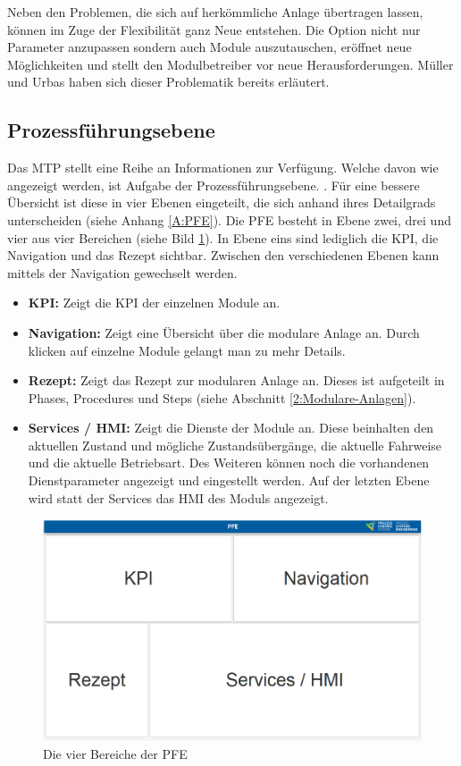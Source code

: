 Neben den Problemen, die sich auf herkömmliche Anlage übertragen lassen, können im Zuge der Flexibilität ganz Neue entstehen. Die Option nicht nur Parameter anzupassen sondern auch Module auszutauschen, eröffnet neue Möglichkeiten und stellt den Modulbetreiber vor neue Herausforderungen. Müller und Urbas \cite{Muller2017} haben sich dieser Problematik bereits erläutert.

\subsection{Prozessführungsebene}
\label{3:PFE}
Das MTP stellt eine Reihe an Informationen zur Verfügung. Welche davon wie angezeigt werden, ist Aufgabe der Prozessführungsebene.  . Für eine bessere Übersicht ist diese in vier Ebenen eingeteilt, die sich anhand ihres Detailgrads unterscheiden (siehe Anhang \ref{A:PFE}). Die PFE besteht in Ebene zwei, drei und vier aus vier Bereichen (siehe Bild \ref{pic:Bereiche-PFE}). In Ebene eins sind lediglich die KPI, die Navigation und das Rezept sichtbar. Zwischen den verschiedenen Ebenen kann mittels der Navigation gewechselt werden.
\begin{itemize}
\item \textbf{KPI:} Zeigt die KPI der einzelnen Module an.
\item \textbf{Navigation:} Zeigt eine Übersicht über die modulare Anlage an. Durch klicken auf einzelne Module gelangt man zu mehr Details.
\item \textbf{Rezept:} Zeigt das Rezept zur modularen Anlage an. Dieses ist aufgeteilt in Phases, Procedures und Steps (siehe Abschnitt \ref{2:Modulare-Anlagen}).
\item \textbf{Services / HMI:} Zeigt die Dienste der Module an. Diese beinhalten den aktuellen Zustand und mögliche Zustandsübergänge, die aktuelle Fahrweise und die aktuelle Betriebsart. Des Weiteren können noch die vorhandenen Dienstparameter angezeigt und eingestellt werden. Auf der letzten Ebene wird statt der Services das HMI des Moduls angezeigt.
\end{itemize}
\begin{figure}[h]
\centering
\includegraphics[scale=0.25]{DA_files/Bilder/Analyse/PFE-Bereiche.png}
\caption{Die vier Bereiche der PFE}
\label{pic:Bereiche-PFE}
\end{figure}



